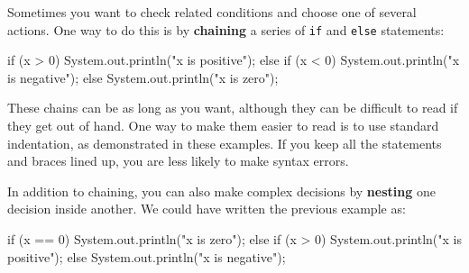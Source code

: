 \documentclass[12pt]{book}
\theoremstyle{exercise}
\newcommand{\java}[1]{\verb"#1"}
\newcommand{\java}[1]{\lstinline{#1}} %
\begin{document}
%
%
%
%
%
%


Sometimes you want to check related conditions and choose one of several actions.
One way to do this is by {\bf chaining} a series of \java{if} and \java{else} statements:

\begin{code}
    if (x > 0) {
        System.out.println("x is positive");
    } else if (x < 0) {
        System.out.println("x is negative");
    } else {
        System.out.println("x is zero");
    }
\end{code}

These chains can be as long as you want, although they can be difficult to read if they get out of hand.
One way to make them easier to read is to use standard indentation, as demonstrated in these examples.
If you keep all the statements and braces lined up, you are less likely to make syntax errors.


In addition to chaining, you can also make complex decisions by {\bf nesting} one decision inside another.
We could have written the previous example as:

\begin{code}
    if (x == 0) {
        System.out.println("x is zero");
    } else {
        if (x > 0) {
            System.out.println("x is positive");
        } else {
            System.out.println("x is negative");
        }
    }
\end{code}
\end{document}
